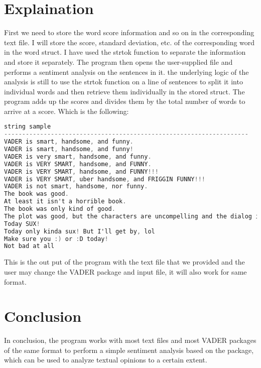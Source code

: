 \documentclass{article}
\begin{document}
\section{Explaination}
First we need to store the word score information and so on in the corresponding text file. I will store the score, standard deviation, etc. of the corresponding word in the word struct. I have used the strtok function to separate the information and store it separately. The program then opens the user-supplied file and performs a sentiment analysis on the sentences in it. the underlying logic of the analysis is still to use the strtok function on a line of sentences to split it into individual words and then retrieve them individually in the stored struct. The program adds up the scores and divides them by the total number of words to arrive at a score.
Which is the following:
\begin{lstlisting}[language=C]
      string sample                                                                                       score
--------------------------------------------------------------------
VADER is smart, handsome, and funny.                                                                     0.97
VADER is smart, handsome, and funny!                                                                     0.97
VADER is very smart, handsome, and funny.                                                                0.83
VADER is VERY SMART, handsome, and FUNNY.                                                                0.83
VADER is VERY SMART, handsome, and FUNNY!!!                                                              0.83
VADER is VERY SMART, uber handsome, and FRIGGIN FUNNY!!!                                                 0.64
VADER is not smart, handsome, nor funny.                                                                 0.83
The book was good.                                                                                       0.47
At least it isn't a horrible book.                                                                       -0.36
The book was only kind of good.                                                                          0.61
The plot was good, but the characters are uncompelling and the dialog is not great.                      0.27
Today SUX!                                                                                               -0.75
Today only kinda sux! But I'll get by, lol                                                               0.16
Make sure you :) or :D today!                                                                            0.80
Not bad at all                                                                                           -0.62
\end{lstlisting}
This is the out put of the program with the text file that we provided and the user may change the VADER package and input file, it will also work for same format.
\section{Conclusion}
In conclusion, the program works with most text files and most VADER packages of the same format to perform a simple sentiment analysis based on the package, which can be used to analyze textual opinions to a certain extent.
\end{document}
